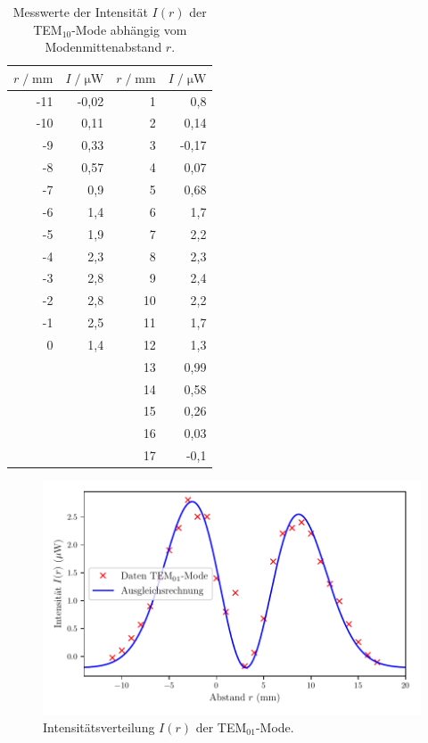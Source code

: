 \begin{table}[H]
  \centering
  \footnotesize
  \caption{Messwerte der Intensität $I(r)$ der TEM$_{10}$-Mode abhängig vom Modenmittenabstand $r$.}
  \label{tab:TEM10}
  \begin{tabular}{r r | r r}
  \toprule
  $r \;/\; \si{\milli\meter}$ & $I \;/\; \si{\micro\watt}$ & $r \;/\; \si{\milli\meter}$ & $I \;/\; \si{\micro\watt}$ \\
  \midrule
    -11 & -0,02 &  1   & 0,8   \\
    -10 & 0,11  &  2   & 0,14  \\
    -9  & 0,33  &  3   & -0,17 \\
    -8  & 0,57  &   4   & 0,07  \\
    -7  & 0,9   &  5   & 0,68  \\
    -6  & 1,4   &  6   & 1,7   \\
    -5  & 1,9   &  7   & 2,2   \\
    -4  & 2,3   &  8   & 2,3   \\
    -3  & 2,8   &  9   & 2,4   \\
    -2  & 2,8   &  10  & 2,2   \\
    -1  & 2,5   &  11  & 1,7   \\
    0   & 1,4   &  12  & 1,3   \\
        & 	    &  13  & 0,99  \\
        & 	    &  14  & 0,58  \\
        & 	    &  15  & 0,26  \\
        & 	    &  16  & 0,03  \\
        & 	    &  17  & -0,1  \\
  \bottomrule
  \end{tabular}
\end{table}


\begin{figure}[H]
  \centering
  \includegraphics[scale=0.65]{TEM01.pdf}
  \vspace{-10pt}
  \caption{Intensitätsverteilung $I(r)$ der TEM$_{01}$-Mode.}
  \label{fig:TEM01}
\end{figure}


